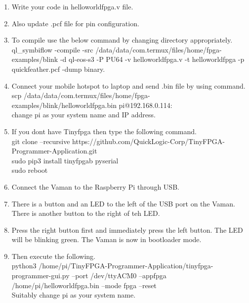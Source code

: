 \documentclass[journal,12pt,twocolumn]{IEEEtran}
\begin{document}
 \begin{enumerate}[label={\arabic*}.]
 \item Write your code in helloworldfpga.v file.
 \item Also update .pcf file for pin configuration.
 \item To compile use the below command by changing directory appropriately.\\
 ql\_symbiflow -compile -src /data/data/com.termux/files/home/fpga-examples/blink -d ql-eos-s3 -P PU64 -v helloworldfpga.v -t helloworldfpga -p quickfeather.pcf -dump binary.
 \item Connect your mobile hotspot to laptop and send .bin file by using command.\\
 scp /data/data/com.termux/files/home/fpga-examples/blink/helloworldfpga.bin pi@192.168.0.114:\\
 change pi as your system name and IP address. 
 \item If you dont have Tinyfpga then type the following command.\\
 git clone --recursive https://github.com/QuickLogic-Corp/TinyFPGA-Programmer-Application.git\\
 sudo pip3 install tinyfpgab pyserial\\
 sudo reboot\\
 \item Connect the Vaman to the Raspberry Pi through USB.
 \item There is a button and an LED to the left of the USB port on the Vaman.  There is another button to the right of teh LED.
 \item Press the right button first and immediately press the left button.  The LED will be blinking green.  The Vaman is now in bootloader mode.
 \item  Then execute the following.\\
 python3 /home/pi/TinyFPGA-Programmer-Application/tinyfpga-programmer-gui.py --port /dev/ttyACM0 --appfpga /home/pi/helloworldfpga.bin --mode fpga --reset\\
 Suitably change pi as your system name.
 \end{enumerate}
\end{document}
